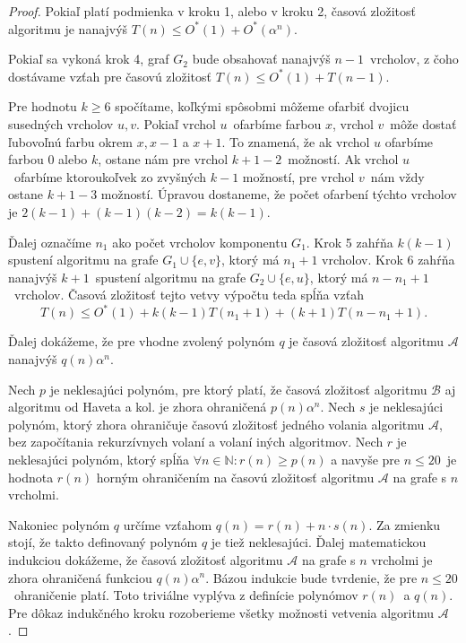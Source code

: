 \begin{proof}
    Pokiaľ platí podmienka v kroku 1, alebo v kroku 2, časová zložitosť algoritmu je nanajvýš
    $T(n) \leq O^*(1) + O^*(\alpha^n)$.

    Pokiaľ sa vykoná krok 4, graf $G_2$ bude obsahovať nanajvýš $n-1$ vrcholov, z čoho dostávame
    vzťah pre časovú zložitosť $T(n) \leq O^*(1) + T(n-1)$.

    Pre hodnotu $k \ge 6$ spočítame, koľkými spôsobmi môžeme ofarbiť dvojicu susedných vrcholov $u, v$.
    Pokiaľ vrchol $u$ ofarbíme farbou $x$, vrchol $v$ môže dostať ľubovoľnú farbu okrem $x, x-1$ a $x + 1$.
    To znamená, že ak vrchol $u$ ofarbíme farbou $0$ alebo $k$, ostane nám pre vrchol $k + 1 - 2$ možností.
    Ak vrchol $u$ ofarbíme ktoroukoľvek zo zvyšných $k-1$ možností, pre vrchol $v$ nám vždy ostane $k + 1 - 3$
    možností. Úpravou dostaneme, že počet ofarbení týchto vrcholov je $2(k-1) + (k-1)(k-2) = k(k-1)$.

    Ďalej označíme $n_1$ ako počet vrcholov komponentu $G_1$. 
    Krok 5 zahŕňa $k(k-1)$ spustení algoritmu na grafe $G_1 \cup \{e, v\}$, ktorý má $n_1 + 1$
    vrcholov. Krok 6 zahŕňa nanajvýš $k+1$ spustení algoritmu na grafe $G_2 \cup \{e, u\}$, ktorý
    má $n - n_1 + 1$ vrcholov. Časová zložitosť tejto vetvy výpočtu teda spĺňa vzťah 
    $$T(n) \leq O^*(1) + k(k-1)T(n_1+1) + (k+1)T(n - n_1 + 1).$$

    Ďalej dokážeme, že pre vhodne zvolený polynóm $q$ je časová zložitosť
    algoritmu $\mathcal{A}$ nanajvýš $q(n) \alpha^n$.

    Nech $p$ je neklesajúci polynóm, pre ktorý platí, že časová zložitosť algoritmu $\mathcal{B}$ aj algoritmu
    od Haveta a kol. je zhora ohraničená $p(n)\alpha^n$. Nech $s$ je neklesajúci polynóm, ktorý
    zhora ohraničuje časovú zložitosť jedného volania algoritmu $\mathcal{A}$, bez započítania 
    rekurzívnych volaní a volaní iných algoritmov. Nech $r$ je neklesajúci polynóm, ktorý spĺňa
    $\forall n \in \mathbb{N}: r(n) \ge p(n)$ a navyše pre $n \leq 20$ je hodnota $r(n)$ horným
    ohraničením na časovú zložitosť algoritmu $\mathcal{A}$ na grafe s $n$ vrcholmi.

    Nakoniec polynóm $q$ určíme vzťahom $q(n) = r(n) + n \cdot s(n)$. Za zmienku stojí, že takto
    definovaný polynóm $q$ je tiež neklesajúci. Ďalej matematickou indukciou
    dokážeme, že časová zložitosť algoritmu $\mathcal{A}$ na grafe s $n$ vrcholmi je zhora ohraničená
    funkciou $q(n) \alpha^n$. Bázou indukcie bude tvrdenie, že pre $n \leq 20$ ohraničenie platí. Toto
    triviálne vyplýva z definície polynómov $r(n)$ a $q(n)$. Pre dôkaz indukčného kroku rozoberieme
    všetky možnosti vetvenia algoritmu $\mathcal{A}$.


\end{proof}
